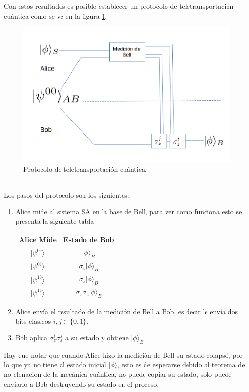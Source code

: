 \documentclass[a4paper]{article}
\begin{document}
Con estos resultados es posible establecer un protocolo de teletransportación cuántica como se ve en la figura \ref{fig::qt_protocol}.
\begin{figure}[h]
\begin{center}
\includegraphics[scale=0.20]{./teletransportation_protocol.png} 
\end{center} 
\caption{Protocolo de teletransportación cuántica.}
\label{fig::qt_protocol}
\end{figure}\\
\linebreak
\pagebreak
\newpage
Los pasos del protocolo son los siguientes:
\begin{enumerate}
\item Alice mide al sistema SA en la base de Bell, para ver como funciona esto se presenta la siguiente tabla
\begin{center}
\begin{tabular}{ |c|c| } 
 \hline
 Alice Mide & Estado de Bob\\ \hline
 $|\psi^{00}\rangle$  & $|\phi\rangle_B$\\\hline
 $|\psi^{01}\rangle$  & $\sigma_x|\phi\rangle_B$\\\hline
 $|\psi^{10}\rangle$  & $\sigma_z|\phi\rangle_B$\\\hline
 $|\psi^{11}\rangle$  & $\sigma_x\sigma_z|\phi\rangle_B$\\
 \hline
\end{tabular}
\end{center}

\item Alice envía el resultado de la medición de Bell a Bob, es decir le envía dos bits clasicos $i,j \in \{0,1\}$.
\item Bob aplica $\sigma_z^i\sigma_x^j$ a su estado y obtiene $|\phi\rangle_B$
\end{enumerate}
Hay que notar que cuando Alice hizo la medición de Bell su estado colapsó, por lo que ya no  tiene al estado inicial $|\phi\rangle$, esto es de esperarse debido al teorema de no-clonacion de la mecánica cuántica, no puede copiar su estado, solo puede enviarlo a Bob destruyendo su estado en el proceso.
\end{document}
